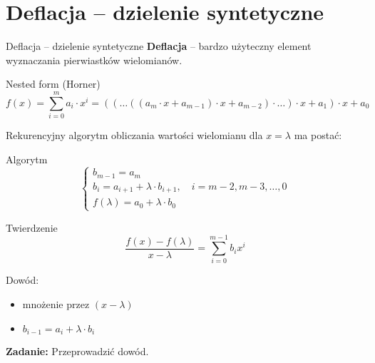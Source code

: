\section{Deflacja -- dzielenie syntetyczne}

\begin{frame}{Deflacja -- dzielenie syntetyczne}
  \textbf{Deflacja} -- bardzo użyteczny element wyznaczania pierwiastków wielomianów. %

  \begin{block}{Nested form (Horner)}
    $$ f(x) = \sum_{i=0}^m a_i \cdot x^i = ( ( \dots (( a_m \cdot x + a_{m-1}) \cdot x + a_{m-2} ) \cdot \dots) \cdot x + a_1) \cdot x + a_0 $$
  \end{block}
\end{frame}

\begin{frame}
  Rekurencyjny algorytm obliczania wartości wielomianu dla $x = \lambda$ ma postać:

  \begin{block}{Algorytm}
    $$ \left \{ \begin{array}{l}
    b_{m-1} = a_m \\
    b_i = a_{i+1} + \lambda \cdot b_{i+1}, \quad i = m - 2, m-3, \dots, 0 \\
    f( \lambda ) = a_{0} + \lambda \cdot b_{0}
    \end{array} \right. $$
  \end{block}
\end{frame}

\begin{frame}

  \begin{block}{Twierdzenie}
    $$ \frac{f(x) - f(\lambda)}{x - \lambda} = \sum_{i=0}^{m-1} b_i x^i $$
  \end{block}

  Dowód:

  \begin{itemize}
    \item mnożenie przez $(x - \lambda)$
    \item $ b_{i-1} = a_i + \lambda \cdot b_i $
  \end{itemize}

  \vspace{5px}

  \textbf{Zadanie:} Przeprowadzić dowód.
\end{frame}
